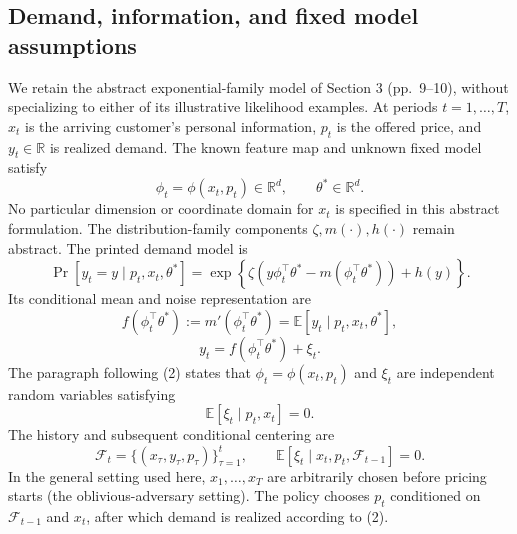 \documentclass{article}
\begin{document}
\subsection*{Demand, information, and fixed model assumptions}
We retain the abstract exponential-family model of Section 3 (pp.~9--10), without specializing to either of its illustrative likelihood examples. At periods $t=1,\ldots,T$, $x_t$ is the arriving customer's personal information, $p_t$ is the offered price, and $y_t\in\mathbb R$ is realized demand. The known feature map and unknown fixed model satisfy
\[
\phi_t=\phi(x_t,p_t)\in\mathbb R^d,
\qquad \theta^*\in\mathbb R^d.
\]
No particular dimension or coordinate domain for $x_t$ is specified in this abstract formulation. The distribution-family components $\zeta,m(\cdot),h(\cdot)$ remain abstract. The printed demand model is
\begin{equation}
\Pr[y_t=y\mid p_t,x_t,\theta^*]
=\exp\!\left\{\zeta\left(y\phi_t^{\top}\theta^*
-m(\phi_t^{\top}\theta^*)\right)+h(y)\right\}.
\tag{1}
\end{equation}
Its conditional mean and noise representation are
\[
f(\phi_t^{\top}\theta^*):=m'(\phi_t^{\top}\theta^*)
=\mathbb E[y_t\mid p_t,x_t,\theta^*],
\]
\begin{equation}
y_t=f(\phi_t^{\top}\theta^*)+\xi_t.
\tag{2}
\end{equation}
The paragraph following (2) states that $\phi_t=\phi(x_t,p_t)$ and $\xi_t$ are independent random variables satisfying
\[
\mathbb E[\xi_t\mid p_t,x_t]=0.
\]
The history and subsequent conditional centering are
\[
\mathcal F_t=\{(x_\tau,y_\tau,p_\tau)\}_{\tau=1}^{t},
\qquad
\mathbb E[\xi_t\mid x_t,p_t,\mathcal F_{t-1}]=0.
\]
In the general setting used here, $x_1,\ldots,x_T$ are arbitrarily chosen before pricing starts (the oblivious-adversary setting). The policy chooses $p_t$ conditioned on $\mathcal F_{t-1}$ and $x_t$, after which demand is realized according to (2).
\end{document}
